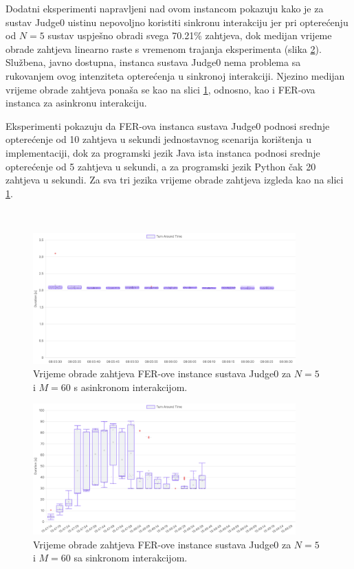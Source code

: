\documentclass[times, utf8, diplomski]{fer}
\begin{document}
Dodatni eksperimenti napravljeni nad ovom instancom pokazuju kako je za sustav Judge0 uistinu nepovoljno koristiti sinkronu interakciju jer pri opterećenju od $N=5$ sustav uspješno obradi svega 70.21\% zahtjeva, dok medijan vrijeme obrade zahtjeva linearno raste s vremenom trajanja eksperimenta (slika \ref{fig:judge0-fer-2}). Službena, javno dostupna, instanca sustava Judge0 \citep{Judge0CE} nema problema sa rukovanjem ovog intenziteta opterećenja u sinkronoj interakciji. Njezino medijan vrijeme obrade zahtjeva ponaša se kao na slici \ref{fig:judge0-fer-1}, odnosno, kao i FER-ova instanca za asinkronu interakciju.

\pagebreak

Eksperimenti pokazuju da FER-ova instanca sustava Judge0 podnosi srednje opterećenje od 10 zahtjeva u sekundi jednostavnog scenarija korištenja u  implementaciji, dok za programski jezik Java ista instanca podnosi srednje opterećenje od 5 zahtjeva u sekundi, a za programski jezik Python čak 20 zahtjeva u sekundi. Za sva tri jezika vrijeme obrade zahtjeva izgleda kao na slici \ref{fig:judge0-fer-1}.

\

\begin{figure}[htb]
	\centering
	\includegraphics[width=0.9\textwidth]{images/Judge0 FER TAT for 5 5s.png}
	\caption{
		Vrijeme obrade zahtjeva FER-ove instance sustava Judge0 za $N=5$ i $M=60$ s asinkronom interakcijom.
	}
	\label{fig:judge0-fer-1}
\end{figure}

\begin{figure}[htb]
	\centering
	\includegraphics[width=0.9\textwidth]{images/Judge0 FER TAT for sync 5 5s.png}
	\caption{
		Vrijeme obrade zahtjeva FER-ove instance sustava Judge0 za $N=5$ i $M=60$ sa sinkronom interakcijom.
	}
	\label{fig:judge0-fer-2}
\end{figure}
\end{document}
